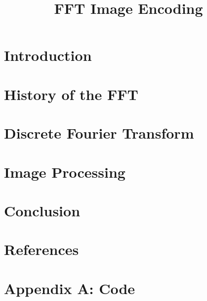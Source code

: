 \documentclass[sigplan]{acmart}
\title{FFT Image Encoding}
\begin{document}
  \maketitle

  \section{Introduction}
	

  \section{History of the FFT}
	

  \section{Discrete Fourier Transform}
	

  \section{Image Processing}
	

  \section{Conclusion}
	

  \section{References}
	

  \section{Appendix A: Code}
	
\end{document}
